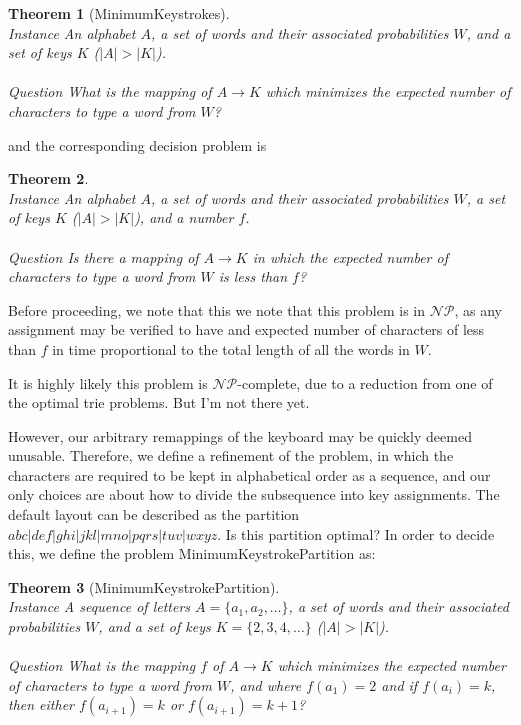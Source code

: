 \documentclass{article}
\newtheorem{theorem}{Theorem}
\newcommand{\NP}{\ensuremath{\mathcal{NP}}}
\begin{document}
\begin{theorem}[{\sc MinimumKeystrokes}]~\\
\label{thm:minstrokes}
{\sc Instance} An alphabet $A$, a set of words and their associated probabilities $W$, and a set of keys $K$ ($|A| > |K|$).\\
~\\
{\sc Question} What is the mapping of $A \to K$ which minimizes the expected number of characters to type a word from $W$?
\end{theorem}

and the corresponding decision problem is

\begin{theorem}~\\
{\sc Instance} An alphabet $A$, a set of words and their associated probabilities $W$, a set of keys $K$ ($|A| > |K|$), and a number $f$.\\
~\\
{\sc Question} Is there a mapping of $A \to K$ in which the expected number of characters to type a word from $W$ is less than $f$?
\end{theorem}

Before proceeding, we note that this we note that this problem is in \NP, as
any assignment may be verified to have and expected number of characters of
less than $f$ in time proportional to the total length of all the words in $W$.

It is highly likely this problem is \NP-complete, due to a reduction from one of the optimal trie problems.  But I'm not there yet.

However, our arbitrary remappings of the keyboard may be quickly deemed unusable.  Therefore, we define a refinement of the problem, in which the characters are required to be kept in alphabetical order as a sequence, and our only choices are about how to divide the subsequence into key assignments.  The default layout can be described as the partition $abc|def|ghi|jkl|mno|pqrs|tuv|wxyz$.  Is this partition optimal?  In order to decide this, we define the problem {\sc MinimumKeystrokePartition} as:
\begin{theorem}[{\sc MinimumKeystrokePartition}]~\\
\label{thm:minpartition}
{\sc Instance} A sequence of letters $A = \{a_1, a_2, \ldots \}$, a set of words and their associated probabilities $W$, and a set of keys $K = \{2, 3, 4, \ldots \}$ ($|A| > |K|$).\\
~\\
{\sc Question} What is the mapping $f$ of $A \to K$ which minimizes the expected number of characters to type a word from $W$, and where $f(a_1) = 2$ and if $f(a_i) = k$, then either $f(a_{i+1}) = k$ or $f(a_{i+1}) = k+1$?
\end{theorem}
\end{document}
